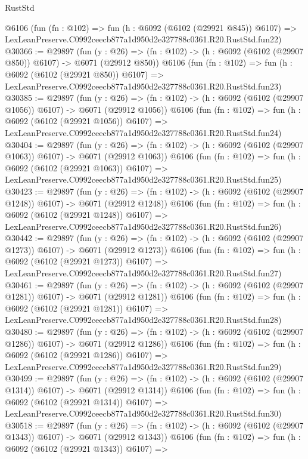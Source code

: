 \begin{lexlean}{RustStd}
\begin{coremodule}
    @6106
    (fun (fn : @102) =>
    fun (h : @6092 (@6102 (@29921 @845)) @6107) =>
    LexLeanPreserve.C0992ceecb877a1d950d2e327788c0361.R20.RustStd.fun22)
@30366 := @29897
    (fun (y : @26) => (fn : @102) -> (h : @6092 (@6102 (@29907 @850)) @6107) -> @6071 (@29912 @850))
    @6106
    (fun (fn : @102) =>
    fun (h : @6092 (@6102 (@29921 @850)) @6107) =>
    LexLeanPreserve.C0992ceecb877a1d950d2e327788c0361.R20.RustStd.fun23)
@30385 := @29897
    (fun (y : @26) =>
    (fn : @102) -> (h : @6092 (@6102 (@29907 @1056)) @6107) -> @6071 (@29912 @1056))
    @6106
    (fun (fn : @102) =>
    fun (h : @6092 (@6102 (@29921 @1056)) @6107) =>
    LexLeanPreserve.C0992ceecb877a1d950d2e327788c0361.R20.RustStd.fun24)
@30404 := @29897
    (fun (y : @26) =>
    (fn : @102) -> (h : @6092 (@6102 (@29907 @1063)) @6107) -> @6071 (@29912 @1063))
    @6106
    (fun (fn : @102) =>
    fun (h : @6092 (@6102 (@29921 @1063)) @6107) =>
    LexLeanPreserve.C0992ceecb877a1d950d2e327788c0361.R20.RustStd.fun25)
@30423 := @29897
    (fun (y : @26) =>
    (fn : @102) -> (h : @6092 (@6102 (@29907 @1248)) @6107) -> @6071 (@29912 @1248))
    @6106
    (fun (fn : @102) =>
    fun (h : @6092 (@6102 (@29921 @1248)) @6107) =>
    LexLeanPreserve.C0992ceecb877a1d950d2e327788c0361.R20.RustStd.fun26)
@30442 := @29897
    (fun (y : @26) =>
    (fn : @102) -> (h : @6092 (@6102 (@29907 @1273)) @6107) -> @6071 (@29912 @1273))
    @6106
    (fun (fn : @102) =>
    fun (h : @6092 (@6102 (@29921 @1273)) @6107) =>
    LexLeanPreserve.C0992ceecb877a1d950d2e327788c0361.R20.RustStd.fun27)
@30461 := @29897
    (fun (y : @26) =>
    (fn : @102) -> (h : @6092 (@6102 (@29907 @1281)) @6107) -> @6071 (@29912 @1281))
    @6106
    (fun (fn : @102) =>
    fun (h : @6092 (@6102 (@29921 @1281)) @6107) =>
    LexLeanPreserve.C0992ceecb877a1d950d2e327788c0361.R20.RustStd.fun28)
@30480 := @29897
    (fun (y : @26) =>
    (fn : @102) -> (h : @6092 (@6102 (@29907 @1286)) @6107) -> @6071 (@29912 @1286))
    @6106
    (fun (fn : @102) =>
    fun (h : @6092 (@6102 (@29921 @1286)) @6107) =>
    LexLeanPreserve.C0992ceecb877a1d950d2e327788c0361.R20.RustStd.fun29)
@30499 := @29897
    (fun (y : @26) =>
    (fn : @102) -> (h : @6092 (@6102 (@29907 @1314)) @6107) -> @6071 (@29912 @1314))
    @6106
    (fun (fn : @102) =>
    fun (h : @6092 (@6102 (@29921 @1314)) @6107) =>
    LexLeanPreserve.C0992ceecb877a1d950d2e327788c0361.R20.RustStd.fun30)
@30518 := @29897
    (fun (y : @26) =>
    (fn : @102) -> (h : @6092 (@6102 (@29907 @1343)) @6107) -> @6071 (@29912 @1343))
    @6106
    (fun (fn : @102) =>
    fun (h : @6092 (@6102 (@29921 @1343)) @6107) =>

\end{coremodule}
\end{lexlean}
